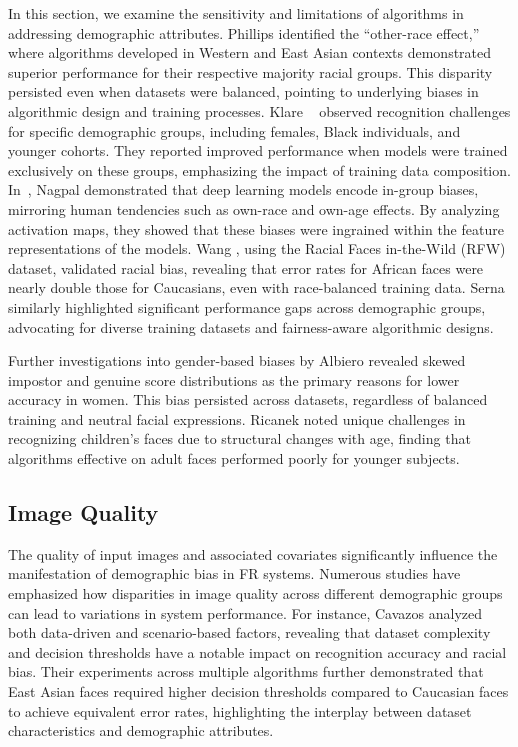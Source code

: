 In this section, we examine the sensitivity and limitations of algorithms in
addressing demographic attributes. Phillips \etal \cite{phillips2011other}
identified the ``other-race effect,'' where algorithms developed in Western and
East Asian contexts demonstrated superior performance for their respective
majority racial groups. This disparity persisted even when datasets were
balanced, pointing to underlying biases in algorithmic design and training
processes. Klare \etal~\cite{klare2012face} observed recognition challenges for
specific demographic groups, including females, Black individuals, and younger
cohorts. They reported improved performance when models were trained exclusively
on these groups, emphasizing the impact of training data composition.
In~\cite{nagpal2019deep}, Nagpal \etal demonstrated that deep learning models
encode in-group biases, mirroring human tendencies such as own-race and own-age
effects. By analyzing activation maps, they showed that these biases were
ingrained within the feature representations of the models. Wang \etal
\cite{wang2019racial}, using the Racial Faces in-the-Wild (RFW) dataset,
validated racial bias, revealing that error rates for African faces were nearly
double those for Caucasians, even with race-balanced training data. Serna \etal
\cite{serna2019algorithmic} similarly highlighted significant performance gaps
across demographic groups, advocating for diverse training datasets and
fairness-aware algorithmic designs.

Further investigations into gender-based biases by Albiero \etal
\cite{albiero2020analysis} revealed skewed impostor and genuine score
distributions as the primary reasons for lower accuracy in women. This bias
persisted across datasets, regardless of balanced training and neutral facial
expressions. Ricanek \etal \cite{ricanek2015review} noted unique challenges in
recognizing children's faces due to structural changes with age, finding that
algorithms effective on adult faces performed poorly for younger subjects. 



\subsection{Image Quality}

The quality of input images and associated covariates significantly influence
the manifestation of demographic bias in FR systems. Numerous studies have
emphasized how disparities in image quality across different demographic groups
can lead to variations in system performance. For instance, Cavazos \etal
\cite{cavazos2020accuracy} analyzed both data-driven and scenario-based factors,
revealing that dataset complexity and decision thresholds have a notable impact
on recognition accuracy and racial bias. Their experiments across multiple
algorithms further demonstrated that East Asian faces required higher decision
thresholds compared to Caucasian faces to achieve equivalent error rates,
highlighting the interplay between dataset characteristics and demographic
attributes.

